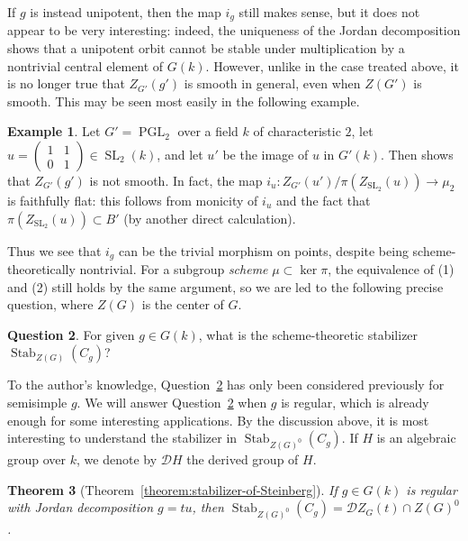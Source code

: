 \documentclass[11pt,reqno]{amsart}
\newtheorem{theorem}{Theorem}[section]
\theoremstyle{definition}
\newtheorem{example}[theorem]{Example}
\newtheorem{question}[theorem]{Question}
\newcommand{\sD}{{\mathscr D}}
\DeclareMathOperator{\PGL}{PGL}
\DeclareMathOperator{\SL}{SL}
\DeclareMathOperator{\Stab}{Stab}
\begin{document}
If $g$ is instead unipotent, then the map $i_g$ still makes sense, but it does not appear to be very interesting: indeed, the uniqueness of the Jordan decomposition shows that a unipotent orbit cannot be stable under multiplication by a nontrivial central element of $G(k)$. However, unlike in the case treated above, it is no longer true that $Z_{G'}(g')$ is smooth in general, even when $Z(G')$ is smooth. This may be seen most easily in the following example.

\begin{example}\label{example:pgl2-centralizer}
    Let $G' = \PGL_2$ over a field $k$ of characteristic $2$, let $u = \begin{pmatrix}
        1 &1 \\ 0 &1
    \end{pmatrix} \in \SL_2(k)$, and let $u'$ be the image of $u$ in $G'(k)$. Then \cite[Example 3.4]{Cotner-Springer} shows that $Z_{G'}(g')$ is not smooth. In fact, the map $i_u\colon Z_{G'}(u')/\pi(Z_{\SL_2}(u)) \to \mu_2$ is faithfully flat: this follows from monicity of $i_u$ and the fact that $\pi(Z_{\SL_2}(u)) \subset B'$ (by another direct calculation).
\end{example}

Thus we see that $i_g$ can be the trivial morphism on points, despite being scheme-theoretically nontrivial. For a subgroup \textit{scheme} $\mu \subset \ker \pi$, the equivalence of (1) and (2) still holds by the same argument, so we are led to the following precise question, where $Z(G)$ is the center of $G$.

\begin{question}\label{question:main}
    For given $g \in G(k)$, what is the scheme-theoretic stabilizer $\Stab_{Z(G)}(C_g)$?
\end{question}

To the author's knowledge, Question~\ref{question:main} has only been considered previously for semisimple $g$. We will answer Question~\ref{question:main} when $g$ is regular, which is already enough for some interesting applications. By the discussion above, it is most interesting to understand the stabilizer in $\Stab_{Z(G)^0}(C_g)$. If $H$ is an algebraic group over $k$, we denote by $\sD H$ the derived group of $H$.

\begin{theorem}[Theorem~\ref{theorem:stabilizer-of-Steinberg}]\label{theorem:intro-stability}
    If $g \in G(k)$ is regular with Jordan decomposition $g = tu$, then $\Stab_{Z(G)^0}(C_g) = \sD Z_G(t) \cap Z(G)^0$.
\end{theorem}
\end{document}
